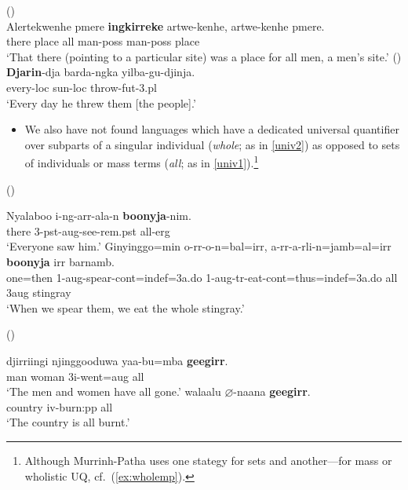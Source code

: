 \documentclass{article}
\begin{document}
\begin{exe}
   (\citealt[132]{wilkins89})\\
  \gll Alertekwenhe pmere \textbf{ingkirreke} artwe-kenhe, artwe-kenhe pmere.\\
  there place all man-{\sc poss} man-{\sc poss} place\\
  \glt `That there (pointing to a particular site) was a place for all men, a men's site.'
   (\citealt[48]{sands89}) \\
  \gll \textbf{Djarin}-dja barda-ngka yilba-gu-djinja.\\
  every-{\sc loc} sun-{\sc loc}   throw-{\sc fut}-3.{\sc pl}\\
  \glt `Every day he threw them [the people].'
\end{exe}

\begin{itemize}
\item We also have not found languages which have a dedicated universal quantifier over subparts of a singular individual (\textit{whole}; as in \ref{univ2}) as opposed to sets of individuals or mass terms (\textit{all}; as in \ref{univ1}).\footnote{Although Murrinh-Patha uses one stategy for sets and another---for mass or wholistic UQ, cf.\ (\ref{ex:wholemp}).}
\end{itemize}
\begin{exe}
   (\citealt[272]{bowern12})
  \begin{xlist}
    \ex\label{univ1} \gll Nyalaboo i-ng-arr-ala-n \textbf{boonyja}-nim.\\
    there 3-{\sc pst}-{\sc aug}-see-{\sc rem.pst} all-{\sc erg}\\
    \glt `Everyone saw him.'
    \ex\label{univ2} \gll Ginyinggo=min o-rr-o-n=bal=irr, a-rr-a-rli-n=jamb=al=irr \textbf{boonyja} irr barnamb.\\
    one={\sc then} 1-{\sc aug}-spear-{\sc cont}={\sc indef}=3{\sc a.do} 1-{\sc aug}-{\sc tr}-eat-{\sc cont}={\sc thus}={\sc indef}=3{\sc a.do} all 3{\sc aug} stingray\\
    \glt `When we spear them, we eat the whole stingray.'
  \end{xlist}
   (\citealt[307]{harvey92})
  \begin{xlist}
    \ex \gll djirriingi njinggooduwa yaa-bu=mba \textbf{geegirr}.\\
    man woman 3{\sc i}-went={\sc aug} all\\
    \glt `The men and women have all gone.'
    \ex \gll walaalu $\varnothing$-naana \textbf{geegirr}.\\
    country {\sc iv}-burn:{\sc pp} all\\
    \glt `The country is all burnt.'
  \end{xlist}
\end{exe}
\end{document}

